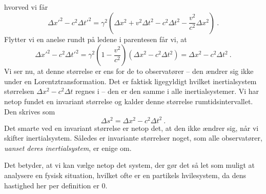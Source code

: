 hvorved vi får
\begin{equation}
\Delta x'^2-c^2\Delta t'^2=\gamma^2\left(\Delta x^2+v^2\Delta t^2-c^2\Delta t^2-\frac{v^2}{c^2}\Delta x^2\right) \: .
\end{equation}
Flytter vi en anelse rundt på ledene i parentesen får vi, at
\begin{equation}
    \Delta x'^2-c^2\Delta t'^2=\gamma^2\left(1-\frac{v^2}{c^2}\right)(\Delta x^2-c^2\Delta t^2)=\Delta x^2-c^2\Delta t^2 \: .
\end{equation}
Vi ser nu, at denne størrelse er ens for de to observatører -- den ændrer sig ikke under en Lorentztransformation.
Det er faktisk ligegyldigt hvilket inertialsystem størrelsen $\Delta x^2-c^2\Delta t$ regnes i -- den er den samme i alle inertialsystemer.
Vi har netop fundet en invariant størrelse og kalder denne størrelse rumtidsintervallet. Den skrives som
\begin{equation}
\Delta s^2=\Delta x^2-c^2\Delta t^2 \: .
\end{equation}
Det smarte ved en invariant størrelse er netop det, at den ikke ændrer sig, når vi skifter inertialsystem. Således er invariante størrelser noget, som alle observatører, \emph{uanset deres inertialsystem}, er enige om.  

Det betyder, at vi kan vælge netop det system, der gør det så let som muligt at analysere en fysisk situation, hvilket ofte er en partikels hvilesystem, da dens hastighed her per definition er $0$. 